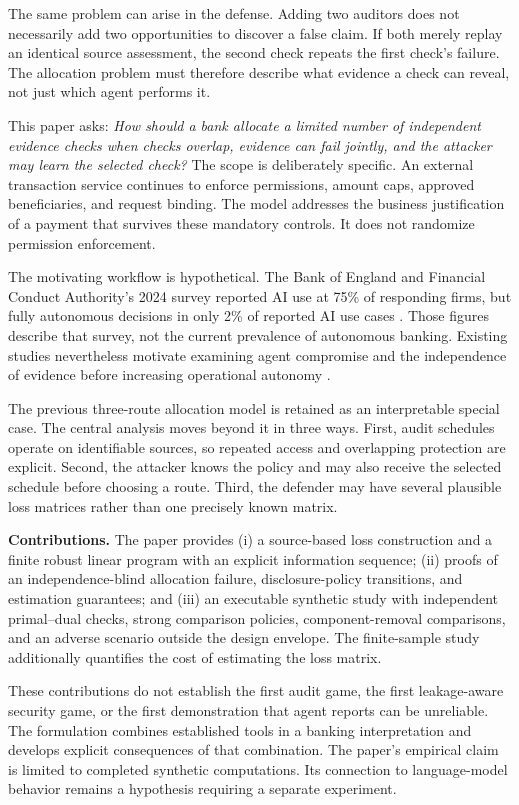 \documentclass[11pt,letterpaper]{article}
\begin{document}
The same problem can arise in the defense. Adding two auditors does not necessarily add two opportunities to discover a false claim. If both merely replay an identical source assessment, the second check repeats the first check's failure. The allocation problem must therefore describe what evidence a check can reveal, not just which agent performs it.

This paper asks: \emph{How should a bank allocate a limited number of independent evidence checks when checks overlap, evidence can fail jointly, and the attacker may learn the selected check?} The scope is deliberately specific. An external transaction service continues to enforce permissions, amount caps, approved beneficiaries, and request binding. The model addresses the business justification of a payment that survives these mandatory controls. It does not randomize permission enforcement.

The motivating workflow is hypothetical. The Bank of England and Financial Conduct Authority's 2024 survey reported AI use at 75\% of responding firms, but fully autonomous decisions in only 2\% of reported AI use cases \cite{boe2024}. Those figures describe that survey, not the current prevalence of autonomous banking. Existing studies nevertheless motivate examining agent compromise and the independence of evidence before increasing operational autonomy \cite{agentdojo,infection,mastrike,relay2026}.

The previous three-route allocation model is retained as an interpretable special case. The central analysis moves beyond it in three ways. First, audit schedules operate on identifiable sources, so repeated access and overlapping protection are explicit. Second, the attacker knows the policy and may also receive the selected schedule before choosing a route. Third, the defender may have several plausible loss matrices rather than one precisely known matrix.

\textbf{Contributions.} The paper provides (i) a source-based loss construction and a finite robust linear program with an explicit information sequence; (ii) proofs of an independence-blind allocation failure, disclosure-policy transitions, and estimation guarantees; and (iii) an executable synthetic study with independent primal--dual checks, strong comparison policies, component-removal comparisons, and an adverse scenario outside the design envelope. The finite-sample study additionally quantifies the cost of estimating the loss matrix.

These contributions do not establish the first audit game, the first leakage-aware security game, or the first demonstration that agent reports can be unreliable. The formulation combines established tools in a banking interpretation and develops explicit consequences of that combination. The paper's empirical claim is limited to completed synthetic computations. Its connection to language-model behavior remains a hypothesis requiring a separate experiment.
\end{document}
